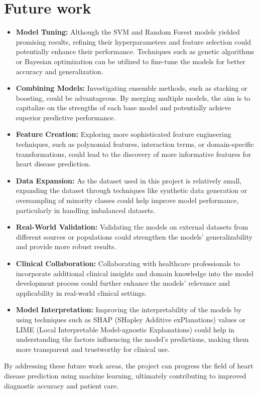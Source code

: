 \section{Future work} \begin{itemize} \item \textbf{Model Tuning:} Although the SVM and Random Forest models yielded promising results, refining their hyperparameters and feature selection could potentially enhance their performance. Techniques such as genetic algorithms or Bayesian optimization can be utilized to fine-tune the models for better accuracy and generalization.

\item \textbf{Combining Models:} Investigating ensemble methods, such as stacking or boosting, could be advantageous. By merging multiple models, the aim is to capitalize on the strengths of each base model and potentially achieve superior predictive performance.

\item \textbf{Feature Creation:} Exploring more sophisticated feature engineering techniques, such as polynomial features, interaction terms, or domain-specific transformations, could lead to the discovery of more informative features for heart disease prediction.

\item \textbf{Data Expansion:} As the dataset used in this project is relatively small, expanding the dataset through techniques like synthetic data generation or oversampling of minority classes could help improve model performance, particularly in handling imbalanced datasets.

\item \textbf{Real-World Validation:} Validating the models on external datasets from different sources or populations could strengthen the models' generalizability and provide more robust results.

\item \textbf{Clinical Collaboration:} Collaborating with healthcare professionals to incorporate additional clinical insights and domain knowledge into the model development process could further enhance the models' relevance and applicability in real-world clinical settings.

\item \textbf{Model Interpretation:} Improving the interpretability of the models by using techniques such as SHAP (SHapley Additive exPlanations) values or LIME (Local Interpretable Model-agnostic Explanations) could help in understanding the factors influencing the model's predictions, making them more transparent and trustworthy for clinical use. \end{itemize}

By addressing these future work areas, the project can progress the field of heart disease prediction using machine learning, ultimately contributing to improved diagnostic accuracy and patient care.
